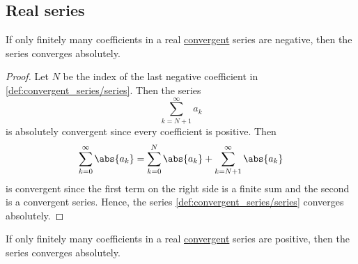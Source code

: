\subsection{Real series}\label{subsec:real_series}

\begin{proposition}\label{thm:almost_all_terms_positive_implies_absolute_convergent}
  If only finitely many coefficients in a real \hyperref[def:convergent_series]{convergent} series are negative, then the series converges absolutely.
\end{proposition}
\begin{proof}
  Let \( N \) be the index of the last negative coefficient in \eqref{def:convergent_series/series}. Then the series
  \begin{equation*}
    \sum_{k={N+1}}^\infty a_k
  \end{equation*}
  is absolutely convergent since every coefficient is positive. Then
  \begin{equation*}
    \sum_{k=0}^\infty \abs{a_k} = \sum_{k=0}^N \abs{a_k} + \sum_{k=N+1}^\infty \abs{a_k}
  \end{equation*}
  is convergent since the first term on the right side is a finite sum and the second is a convergent series. Hence, the series \eqref{def:convergent_series/series} converges absolutely.
\end{proof}

\begin{corollary}\label{thm:almost_all_terms_negative_implies_absolute_convergent}
  If only finitely many coefficients in a real \hyperref[def:convergent_series]{convergent} series are positive, then the series converges absolutely.
\end{corollary}

